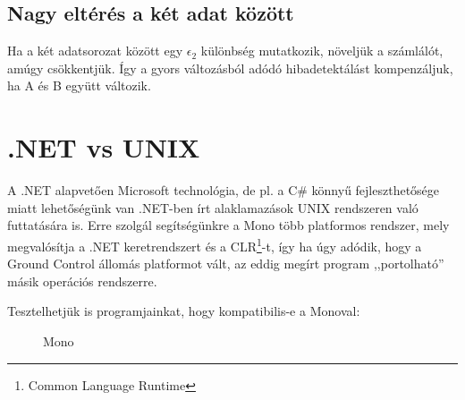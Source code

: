 \documentclass[12pt]{article}
\begin{document}
\begin{itemize}
\subsection{Nagy eltérés a két adat között} Ha a két adatsorozat között egy $\epsilon_2$ különbség mutatkozik, növeljük a számlálót, amúgy csökkentjük. Így a gyors változásból adódó hibadetektálást kompenzáljuk, ha A és B együtt változik.


\begin{figure}[H]
	\centering
	\caption{}
	\label{fig:hib3}
\end{figure}

\section{.NET vs UNIX}
A .NET alapvet\H{o}en Microsoft technológia, de pl. a C\# könny\H{u} fejleszthet\H{o}sége miatt lehet\H{o}ségünk van .NET-ben írt alaklamazások UNIX rendszeren való futtatására is.
Erre szolgál segítségünkre a \cite{bib:mono}Mono több platformos rendszer, mely megvalósítja a .NET keretrendszert és a CLR\footnote{Common Language Runtime}-t, így ha úgy adódik, hogy a Ground Control állomás platformot vált, az eddig megírt program ,,portolható'' másik operációs rendszerre.


Tesztelhetjük is programjainkat, hogy kompatibilis-e a Monoval:
\begin{figure}[H]
	\centering
	\caption{Mono}
	\label{fig:mono}
\end{figure}



\end{itemize}
\end{document}
